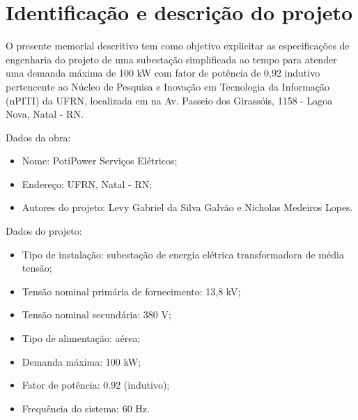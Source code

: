 \section{Identificação e descrição do projeto}

O presente memorial descritivo tem como objetivo explicitar as especificações de engenharia do projeto de uma subestação simplificada ao tempo para atender uma demanda máxima de 100 kW com fator de potência de 0,92 indutivo pertencente ao Núcleo de Pesquisa e Inovação em Tecnologia da Informação (nPITI) da UFRN, localizada em na Av. Passeio dos Girassóis, 1158 - Lagoa Nova, Natal - RN.


Dados da obra:

\begin{itemize}
    \item Nome: PotiPower Serviços Elétricos;
    \item Endereço: UFRN, Natal - RN;
    \item Autores do projeto: Levy Gabriel da Silva Galvão e Nicholas Medeiros Lopes.
\end{itemize}

Dados do projeto:

\begin{itemize}
    \item Tipo de instalação: subestação de energia elétrica transformadora de média tensão;
    \item Tensão nominal primária de fornecimento: 13,8 kV;
    \item Tensão nominal secundária: 380 V;
    \item Tipo de alimentação: aérea;
    \item Demanda máxima: 100 kW;
    \item Fator de potência: 0.92 (indutivo);
    \item Frequência do sistema: 60 Hz.
\end{itemize}
